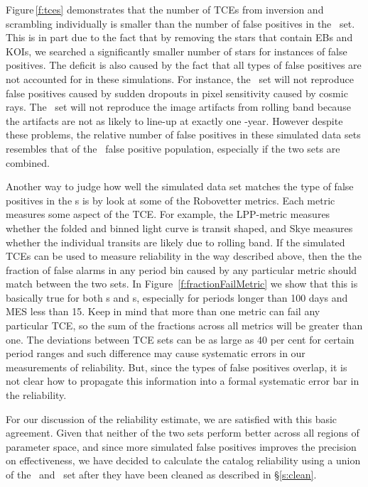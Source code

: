 Figure\,\ref{f:tces} demonstrates that the number of TCEs from inversion and scrambling individually is smaller than the number of false positives in the \opstce\ set. This is in part due to the fact that by removing the stars that contain EBs and KOIs, we searched a significantly smaller number of stars for instances of false positives. The deficit is also caused by the fact that all types of false positives are not accounted for in these simulations. For instance, the \invtce\ set will not reproduce false positives caused by sudden dropouts in pixel sensitivity caused by cosmic rays. The \scrtce\ set will not reproduce the image artifacts from rolling band because the artifacts are not as likely to line-up at exactly one \Kepler -year.  However despite these problems, the relative number of false positives in these simulated data sets resembles that of the \opstce\ false positive population, especially if the two sets are combined.

Another way to judge how well the simulated data set matches the type of false positives in the \opstce s is by look at some of the Robovetter metrics.  Each metric measures some aspect of the TCE. For example, the LPP-metric measures whether the folded and binned light curve is transit shaped, and Skye measures whether the individual transits are likely due to rolling band.  If the simulated TCEs can be used to measure reliability in the way described above, then the the fraction of false alarms in any period bin caused by any particular metric should match between the two sets.  In Figure~\ref{f:fractionFailMetric} we show that this is basically true for both \invtce s and \scrtce s, especially for periods longer than 100 days and MES less than 15.  Keep in mind that more than one metric can fail any particular TCE, so the sum of the fractions across all metrics will be greater than one.  The deviations between TCE sets can be as large as 40 per cent for certain period ranges and such difference may cause systematic errors in our measurements of reliability.  But, since the types of false positives overlap, it is not clear how to propagate this information into a formal systematic error bar in the reliability.  

For our discussion of the reliability estimate, we are satisfied with this basic agreement. Given that neither of the two sets perform better across all regions of parameter space, and since more simulated false positives improves the precision on effectiveness,  we have decided to calculate the catalog reliability using a union of the \scrtce\ and \invtce\ set after they have been cleaned as described in \S\ref{s:clean}.  


